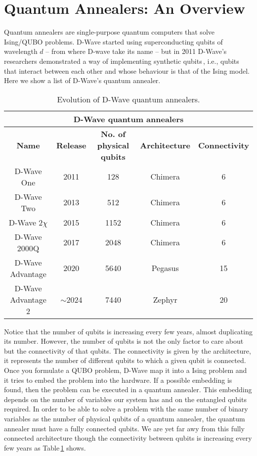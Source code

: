 \section{Quantum Annealers: An Overview} 
Quantum annealers are single-purpose quantum computers that solve Ising/QUBO problems. D-Wave started using superconducting qubits of wavelength $d$ -- from where D-wave take its name -- but in 2011 D-Wave's researchers demonstrated a way of implementing synthetic qubits\,\cite{Johnson2011QuantumSpins}, i.e., qubits that interact between each other and whose behaviour is that of the Ising model. Here we show a list of D-Wave's quantum annealer.
\begin{table}[H]
\begin{tabular}{ |c||c|c|c|c|  }
 \hline
 \multicolumn{5}{|c|}{\textbf{D-Wave quantum annealers}} \\
 \hline
 \textbf{Name} & \textbf{Release} & \textbf{No. of physical qubits} & \textbf{Architecture} & \textbf{Connectivity}\\
 \hline
 D-Wave One         & 2011 & 128      & Chimera & 6\\
 D-Wave Two         & 2013 & 512      & Chimera & 6\\
 D-Wave 2$\chi$     & 2015 & 1152     & Chimera & 6\\
 D-Wave 2000Q       & 2017 & 2048     & Chimera & 6\\
 D-Wave Advantage   & 2020 & 5640     & Pegasus & 15\\
 D-Wave Advantage 2 & $\sim$2024 & 7440 & Zephyr  & 20\\
 \hline
\end{tabular}
\caption{Evolution of D-Wave quantum annealers.}
\label{tab:DwaveAnnealers}
\end{table}
Notice that the number of qubits is increasing every few years, almost duplicating its number. However, the number of qubits is not the only factor to care about but the connectivity of that qubits. The connectivity is given by the architecture, it represents the number of different qubits to which a given qubit is connected. Once you formulate a QUBO problem, D-Wave map it into a Ising problem and it tries to embed the problem into the hardware. If a possible embedding is found, then the problem can be executed in a quantum annealer. This embedding depends on the number of variables our system has and on the entangled qubits required. In order to be able to solve a problem with the same number of binary variables as the number of physical qubits of a quantum annealer, the quantum annealer must have a fully connected qubits. We are yet far awy from this fully connected architecture though the connectivity between qubits is increasing every few years as Table\,\ref{tab:DwaveAnnealers} shows.
